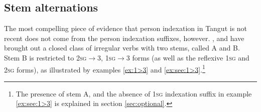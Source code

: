 \documentclass[oldfontcommands,oneside,a4paper,11pt]{article}
\newcommand{\ipa}[1]{{\phon \mbox{#1}}} %
\begin{document}
%
%
%


\subsection{Stem alternations}
The most compelling piece of evidence that person indexation in Tangut is not recent does not come from the person indexation suffixes, however. \citet{gong01huying}, \citet{jacques09tangutverb} and \citet{jacques14esquisse} have brought out a closed class of irregular verbs with two stems, called A and B. Stem B is restricted to \textsc{2sg}$\rightarrow$3, \textsc{1sg}$\rightarrow$3 forms (as well as the reflexive \textsc{1sg} and \textsc{2sg} forms), as illustrated by examples \ref{ex:1>3} and \ref{ex:see:1>3}.\footnote{The presence of stem A, and the absence of \textsc{1sg} indexation suffix in example \ref{ex:see:1>3} is explained in section \ref{sec:optional}.}
\end{document}
